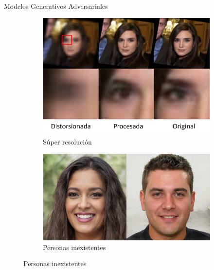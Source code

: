 \documentclass[12pt,aspectratio=169]{beamer}
\begin{document}
\begin{frame}{Modelos Generativos Adversariales}

    \begin{figure}
        \begin{subfigure}{0.48\textwidth}
            \centering
            \includegraphics[scale=0.23]{figs/superresolution_example.png}
            \caption{Súper resolución}
        \end{subfigure}
        \begin{subfigure}{0.48\textwidth}
            \centering
            \includegraphics[scale=0.23]{figs/personas_inexistentes.png}
            \caption{Personas inexistentes}
        \end{subfigure}
    \end{figure}

\end{frame}
\end{document}
